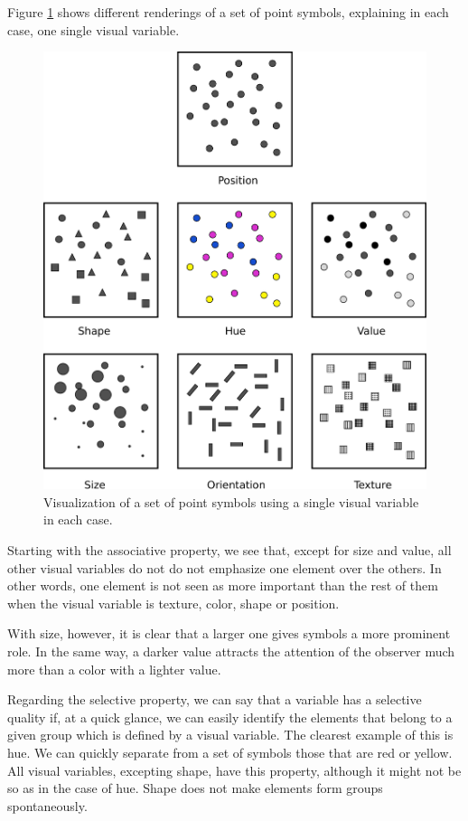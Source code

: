 Figure \ref{Fig:PropertiesVisualVariables} shows different renderings of a set of point symbols, explaining in each case, one single visual variable.

\begin{figure}[!hbt]
\centering
\includegraphics[width=\columnwidth]{Visualization/PropertiesVisualVariables.pdf}
\caption{\small Visualization of a set of point symbols using a single visual variable in each case.}
\label{Fig:PropertiesVisualVariables} 
\end{figure}

Starting with the associative property, we see that, except for size and value, all other visual variables do not do not emphasize one element over the others. In other words, one element is not seen as more important than the rest of them when the visual variable is texture, color, shape or position.

With size, however, it is clear that a larger one gives symbols a more prominent role. In the same way, a darker value attracts the attention of the observer much more than a color with a lighter value.

Regarding the selective property, we can say that a variable has a selective quality if, at a quick glance, we can easily identify the elements that belong to a given group which is defined by a visual variable. The clearest example of this is hue. We can quickly separate from a set of symbols those that are red or yellow. All visual variables, excepting shape, have this property, although it might not be so as in the case of hue. Shape does not make elements form groups spontaneously.

